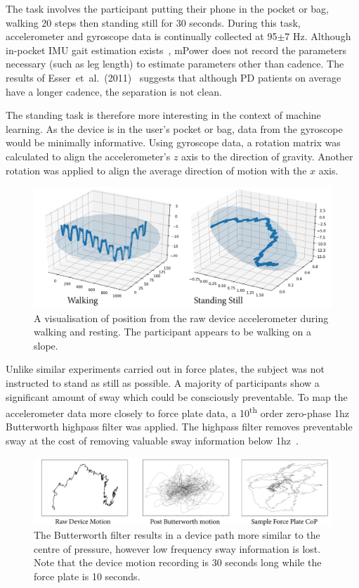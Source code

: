 \documentclass[12pt, twoside]{book}
\renewcommand\emph[1]{\textit{\color{USred}{#1}}}
\begin{document}
The \emph{walking} task involves the participant putting their phone in the pocket or bag, walking 20 steps then standing still for 30 seconds. During this task, accelerometer and gyroscope data is continually collected at 95$\pm$7 Hz. Although in-pocket IMU gait estimation exists~\cite{diaz2014step}, mPower does not record the parameters necessary (such as leg length) to estimate parameters other than cadence. The results of Esser~et~al.~(2011)~\cite{esser2011assessment} suggests that although PD patients on average have a longer cadence, the separation is not clean.

The standing task is therefore more interesting in the context of machine learning. As the device is in the user's pocket or bag, data from the gyroscope would be minimally informative. Using gyroscope data, a rotation matrix was calculated to align the accelerometer's $z$ axis to the direction of gravity. Another rotation was applied to align the average direction of motion with the $x$ axis.

\begin{figure}[h]
\label{mpowerwalking}
\centering\includegraphics[width=0.9\linewidth]{pathvis3d.png}
\caption{A visualisation of position from the raw device accelerometer during walking and resting. The participant appears to be walking on a slope.}
\end{figure}

Unlike similar experiments carried out in force plates, the subject was not instructed to stand as still as possible. A majority of participants show a significant amount of sway which could be consciously preventable. To map the accelerometer data more closely to force plate data, a 10\textsuperscript{th} order zero-phase 1hz Butterworth highpass filter was applied. The highpass filter removes preventable sway at the cost of removing valuable sway information below 1hz~\cite{swayspectral}. 

\begin{figure}[h]
	\label{butterworth}
	\centering\centerline{\includegraphics[width=1.2\linewidth]{butterworth.png}}
	\caption{The Butterworth filter results in a device path more similar to the centre of pressure, however low frequency sway information is lost. Note that the device motion recording is 30 seconds long while the force plate is 10 seconds.}
\end{figure}
\end{document}

